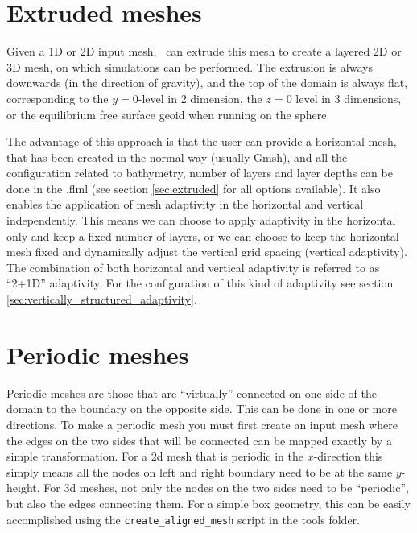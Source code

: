 \section{Extruded meshes}
\label{sec:extruded_meshes}

Given a 1D or 2D input mesh, \fluidity\ can extrude this
mesh to create a layered 2D or 3D mesh, on which simulations can be
performed. The extrusion is always downwards (in the direction of gravity),
and the top of the domain is always flat, corresponding to the $y=0$-level
in 2 dimension, the $z=0$ level in 3 dimensions, or the equilibrium
free surface geoid when running on the sphere.

The advantage of this approach is that the user can provide a horizontal mesh,
that has been created in the normal way (usually Gmsh), and all the
configuration related to bathymetry, number of layers and layer depths can be
done in the .flml (see section \ref{sec:extruded} for all options available). It also
enables the application of mesh adaptivity in the horizontal and vertical
independently. This means we can choose to apply adaptivity in the horizontal
only and keep a fixed number of layers, or we can choose to keep the horizontal
mesh fixed and dynamically adjust the vertical grid spacing (vertical
adaptivity). The combination of both horizontal and vertical adaptivity is
referred to as ``2+1D'' adaptivity. For the configuration of this kind of
adaptivity see section \ref{sec:vertically_structured_adaptivity}.

\section{Periodic meshes}
\label{sec:periodic_meshes}
Periodic meshes are those that are ``virtually'' connected on one side of the
domain to the boundary on the opposite side. This can be done in one or more
directions. To make a periodic
mesh you must first create an input mesh where the edges on the two sides
that will be connected
can be mapped exactly by a simple transformation. For a 2d mesh that is
periodic in the $x$-direction this simply means all the nodes on left and right
boundary need to be at the same $y$-height. For 3d meshes, not only the nodes
on the two sides need to be ``periodic'', but also the edges connecting them.
For a simple box geometry, this can be easily accomplished using the
\lstinline[language=Bash]+create_aligned_mesh+ script in the tools folder.

